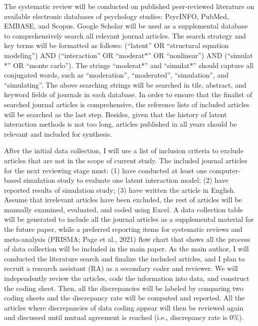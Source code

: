 \documentclass[
  11pt,
  man]{apa6}
\begin{document}
The systematic review will be conducted on published peer-reviewed literature on available electronic databases of psychology studies: PsycINFO, PubMed, EMBASE, and Scopus. Google Scholar will be used as a supplemental database to comprehensively search all relevant journal articles. The search strategy and key terms will be formatted as follows: (``latent'' OR ``structural equation modeling'') AND (``interaction'' OR ``moderat\(\text{*}\)'' OR ``nonlinear'') AND (``simulat\(\text{*}\)'' OR ``monte carlo''). The strings ``moderat\(\text{*}\)'' and ``simulat\(\text{*}\)'' should capture all conjugated words, such as ``moderation'', ``moderated'', ``simulation'', and ``simulating''. The above searching strings will be searched in tile, abstract, and keyword fields of journals in each database. In order to ensure that the finalist of searched journal articles is comprehensive, the reference lists of included articles will be searched as the last step. Besides, given that the history of latent interaction methods is not too long, articles published in all years should be relevant and included for synthesis.

After the initial data collection, I will use a list of inclusion criteria to exclude articles that are not in the scope of current study. The included journal articles for the next reviewing stage must: (1) have conducted at least one computer-based simulation study to evaluate one latent interaction model; (2) have reported results of simulation study; (3) have written the article in English. Assume that irrelevant articles have been excluded, the rest of articles will be manually examined, evaluated, and coded using Excel. A data collection table will be generated to include all the journal articles as a supplemental material for the future paper, while a preferred reporting items for systematic reviews and meta-analysis (PRISMA; Page et al., 2021) flow chart that shows all the process of data collection will be included in the main paper. As the main author, I will conducted the literature search and finalize the included articles, and I plan to recruit a research assistant (RA) as a secondary coder and reviewer. We will independently review the articles, code the information into data, and construct the coding sheet. Then, all the discrepancies will be labeled by comparing two coding sheets and the discrepancy rate will be computed and reported. All the articles where discrepancies of data coding appear will then be reviewed again and discussed until mutual agreement is reached (i.e., discrepancy rate is 0\%).
\end{document}
